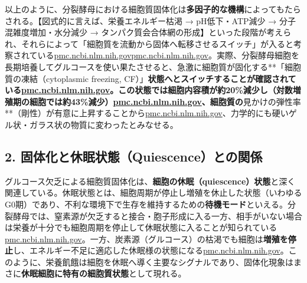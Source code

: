 以上のように、分裂酵母における細胞質固体化は\textbf{多因子的な機構}によってもたらされる。【図式的に言えば、栄養エネルギー枯渇 → pH低下・ATP減少 → 分子混雑度増加・水分減少 → タンパク質会合体網の形成】といった段階が考えられ、それらによって「細胞質を流動から固体へ転移させるスイッチ」が入ると考察されている\href{https://pmc.ncbi.nlm.nih.gov/articles/PMC6857596/\#:~:text=organisation,high\%20amounts\%20of\%20carbohydrates\%2C\%20possibly}{pmc.ncbi.nlm.nih.gov}\href{https://pmc.ncbi.nlm.nih.gov/articles/PMC6857596/\#:~:text=shown\%20to\%20introduce\%20structural\%20changes,2016}{pmc.ncbi.nlm.nih.gov}。実際、分裂酵母細胞を長期培養してグルコースを使い果たさせると、急激に細胞質が固化する**「細胞質の凍結（cytoplasmic freezing, CF）」\textbf{状態へとスイッチすることが確認されている\href{https://pmc.ncbi.nlm.nih.gov/articles/PMC6857596/\#:~:text=run\%20out\%20of\%20nutrients,2016\%20\%3B\%20\%2043}{pmc.ncbi.nlm.nih.gov}。この状態では細胞内容積が約20\%減少し（対数増殖期の細胞では約43\%減少）\href{https://pmc.ncbi.nlm.nih.gov/articles/PMC6857596/\#:~:text=spherical\%20shape\%2C\%20CF\%20cells\%20slipped,Fig}{pmc.ncbi.nlm.nih.gov}、細胞質の}見かけの弾性率**（剛性）が有意に上昇することから\href{https://pmc.ncbi.nlm.nih.gov/articles/PMC4850707/\#:~:text=using\%20the\%20Hertz\%20model\%2C\%20reflects,the\%20cells\%20from\%20the\%20AFM}{pmc.ncbi.nlm.nih.gov}、力学的にも硬いゲル状・ガラス状の物質に変わったとみなせる。

\subsection{2. 固体化と休眠状態（Quiescence）との関係}

グルコース欠乏による細胞質固体化は、\textbf{細胞の休眠（quiescence）状態}と深く関連している。休眠状態とは、細胞周期が停止し増殖を休止した状態（いわゆるG0期）であり、不利な環境下で生存を維持するための\textbf{待機モード}といえる。分裂酵母では、窒素源が欠乏すると接合・胞子形成に入る一方、相手がいない場合は栄養が十分でも細胞周期を停止して休眠状態に入ることが知られている\href{https://pmc.ncbi.nlm.nih.gov/articles/PMC6857596/\#:~:text=When\%20nutrients\%20become\%20growth\%20limiting,yeast\%20cells\%20that\%20have\%20slowly}{pmc.ncbi.nlm.nih.gov}。一方、炭素源（グルコース）の枯渇でも細胞は\textbf{増殖を停止}し、エネルギー不足に適応した休眠様の状態になる\href{https://pmc.ncbi.nlm.nih.gov/articles/PMC3123465/\#:~:text=stochastic\%2C\%20accompanied\%20by\%20a\%20curious,choline\%29\%2C\%20which\%20increased\%20or}{pmc.ncbi.nlm.nih.gov}。このように、栄養飢餓は細胞を休眠へ導く主要なシグナルであり、固体化現象はまさに\textbf{休眠細胞に特有の細胞質状態}として現れる。

